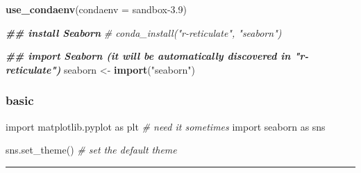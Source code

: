 \documentclass[
]{book}
\newenvironment{Shaded}{\begin{snugshade}}{\end{snugshade}}
\newcommand{\AttributeTok}[1]{\textcolor[rgb]{0.13,0.29,0.53}{#1}}
\newcommand{\CommentTok}[1]{\textcolor[rgb]{0.56,0.35,0.01}{\textit{#1}}}
\newcommand{\DocumentationTok}[1]{\textcolor[rgb]{0.56,0.35,0.01}{\textbf{\textit{#1}}}}
\newcommand{\FunctionTok}[1]{\textcolor[rgb]{0.13,0.29,0.53}{\textbf{#1}}}
\newcommand{\ImportTok}[1]{#1}
\newcommand{\NormalTok}[1]{#1}
\newcommand{\OtherTok}[1]{\textcolor[rgb]{0.56,0.35,0.01}{#1}}
\newcommand{\StringTok}[1]{\textcolor[rgb]{0.31,0.60,0.02}{#1}}
\theoremstyle{definition}
\theoremstyle{definition}
\theoremstyle{definition}
\theoremstyle{definition}
\theoremstyle{remark}
\begin{document}
\begin{Shaded}
\begin{Highlighting}[]
\FunctionTok{use\_condaenv}\NormalTok{(}\AttributeTok{condaenv =} \StringTok{\textquotesingle{}sandbox{-}3.9\textquotesingle{}}\NormalTok{)}

\DocumentationTok{\#\# install Seaborn}
\CommentTok{\# conda\_install("r{-}reticulate", "seaborn")}

\DocumentationTok{\#\# import Seaborn (it will be automatically discovered in "r{-}reticulate")}
\NormalTok{seaborn }\OtherTok{\textless{}{-}} \FunctionTok{import}\NormalTok{(}\StringTok{"seaborn"}\NormalTok{)}
\end{Highlighting}
\end{Shaded}

\hypertarget{basic}{%
\subsubsection{basic}\label{basic}}

\begin{Shaded}
\begin{Highlighting}[]
\ImportTok{import}\NormalTok{ matplotlib.pyplot }\ImportTok{as}\NormalTok{ plt  }\CommentTok{\# need it sometimes}
\ImportTok{import}\NormalTok{ seaborn }\ImportTok{as}\NormalTok{ sns}

\NormalTok{sns.set\_theme() }\CommentTok{\# set the default theme}
\end{Highlighting}
\end{Shaded}

\begin{center}\rule{0.5\linewidth}{0.5pt}\end{center}
\end{document}
